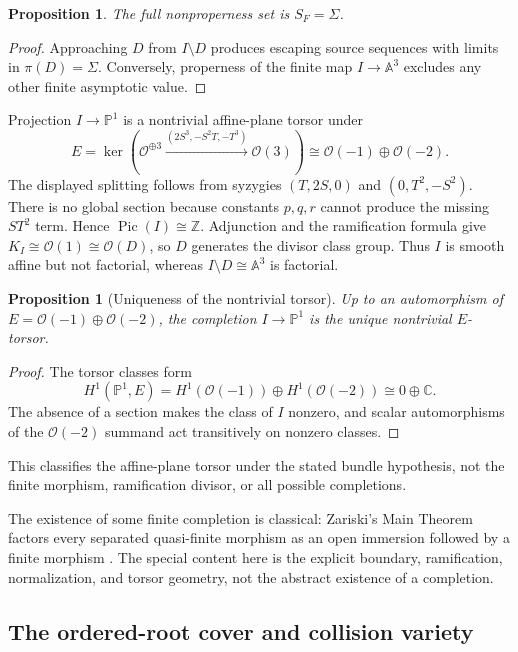 \documentclass[11pt]{article}
\newtheorem{proposition}[theorem]{Proposition}
\theoremstyle{remark}
\newcommand{\A}{\mathbb A}
\newcommand{\C}{\mathbb C}
\newcommand{\Pic}{\operatorname{Pic}}
\begin{document}
\begin{proposition}
The full nonproperness set is $S_F=\Sigma$.
\end{proposition}
\begin{proof}
Approaching $D$ from $I\setminus D$ produces escaping source sequences with
limits in $\pi(D)=\Sigma$. Conversely, properness of the finite map
$I\to\A^3$ excludes any other finite asymptotic value.
\end{proof}

Projection $I\to\mathbb P^1$ is a nontrivial affine-plane torsor under
\[
E=\ker\left(\mathcal O^{\oplus3}\xrightarrow{(2S^3,-S^2T,-T^3)}
\mathcal O(3)\right)\cong\mathcal O(-1)\oplus\mathcal O(-2).
\]
The displayed splitting follows from syzygies $(T,2S,0)$ and
$(0,T^2,-S^2)$. There is no global section because constants $p,q,r$ cannot
produce the missing $ST^2$ term. Hence $\Pic(I)\cong\mathbb Z$. Adjunction and
the ramification formula give $K_I\cong\mathcal O(1)\cong\mathcal O(D)$, so
$D$ generates the divisor class group. Thus $I$ is smooth affine but not
factorial, whereas $I\setminus D\cong\A^3$ is factorial.

\begin{proposition}[Uniqueness of the nontrivial torsor]
Up to an automorphism of
$E=\mathcal O(-1)\oplus\mathcal O(-2)$, the completion
$I\to\mathbb P^1$ is the unique nontrivial $E$-torsor.
\end{proposition}
\begin{proof}
The torsor classes form
\[
H^1(\mathbb P^1,E)=H^1(\mathcal O(-1))\oplus H^1(\mathcal O(-2))
\cong0\oplus\C.
\]
The absence of a section makes the class of $I$ nonzero, and scalar
automorphisms of the $\mathcal O(-2)$ summand act transitively on nonzero
classes.
\end{proof}
This classifies the affine-plane torsor under the stated bundle hypothesis,
not the finite morphism, ramification divisor, or all possible completions.

The existence of some finite completion is classical: Zariski's Main Theorem
factors every separated quasi-finite morphism as an open immersion followed by
a finite morphism \cite{stacks}. The special content here is the explicit boundary,
ramification, normalization, and torsor geometry, not the abstract existence
of a completion.

\subsection{The ordered-root cover and collision variety}
\end{document}
